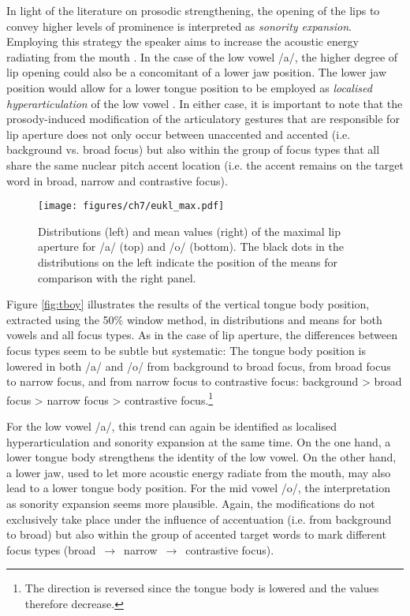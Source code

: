 In light of the literature on prosodic strengthening, the opening of the lips to convey higher levels of prominence is interpreted as \emph{sonority expansion}. Employing this strategy the speaker aims to increase the acoustic energy radiating from the mouth \citep{BeckmanEdwardsFletcher1992}. In the case of the low vowel /a/, the higher degree of lip opening could also be a concomitant of a lower jaw position. The lower jaw position would allow for a lower tongue position to be employed as \emph{localised hyperarticulation} of the low vowel \citep{DeJong1995}. In either case, it is important to note that the prosody-induced modification of the articulatory gestures that are responsible for lip aperture does not only occur between unaccented and accented (i.e. background vs. broad focus) but also within the group of focus types that all share the same nuclear pitch accent location (i.e. the accent remains on the target word in broad, narrow and contrastive focus).

\begin{figure}
\texttt{[image: figures/ch7/eukl\_max.pdf]}
\caption[Distributions and mean values of the maximal lip aperture.]{Distributions (left) and mean values (right) of the maximal lip aperture for /a/ (top) and /o/ (bottom). The black dots in the distributions on the left indicate the position of the means for comparison with the right panel.}
\label{fig:eukl_max}
\end{figure}

Figure \ref{fig:tboy} illustrates the results of the vertical tongue body position, extracted using the 50\% window method, in distributions and means for both vowels and all focus types. As in the case of lip aperture, the differences between focus types seem to be subtle but systematic: The tongue body position is lowered in both /a/ and /o/ from background to broad focus, from broad focus to narrow focus, and from narrow focus to contrastive focus: background > broad focus > narrow focus > contrastive focus.\footnote{The direction is reversed since the tongue body is lowered and the values therefore decrease.}



For the low vowel /a/, this trend can again be identified as localised hyperarticulation and sonority expansion at the same time. On the one hand, a lower tongue body strengthens the identity of the low vowel. On the other hand, a lower jaw, used to let more acoustic energy radiate from the mouth, may also lead to a lower tongue body position. For the mid vowel /o/, the interpretation as sonority expansion seems more plausible. Again, the modifications do not exclusively take place under the influence of accentuation (i.e. from background to broad) but also within the group of accented target words to mark different focus types (broad $\,\to\,$ narrow $\,\to\,$ contrastive focus).

